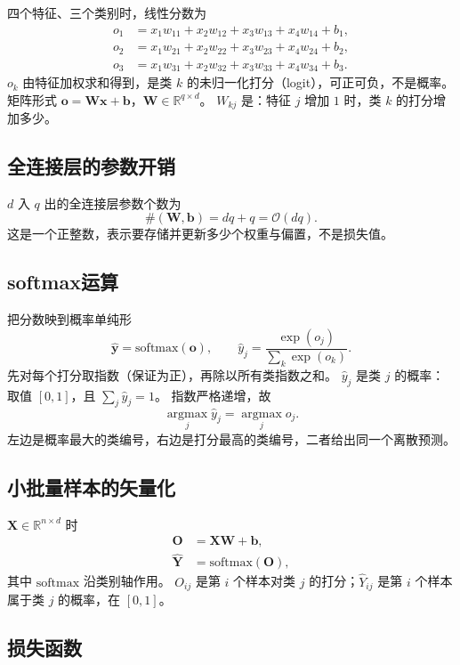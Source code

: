 四个特征、三个类别时，线性分数为
\begin{align*}
o_{1}&=x_{1}w_{11}+x_{2}w_{12}+x_{3}w_{13}+x_{4}w_{14}+b_{1},\\
o_{2}&=x_{1}w_{21}+x_{2}w_{22}+x_{3}w_{23}+x_{4}w_{24}+b_{2},\\
o_{3}&=x_{1}w_{31}+x_{2}w_{32}+x_{3}w_{33}+x_{4}w_{34}+b_{3}.
\end{align*}
$o_k$ 由特征加权求和得到，是类 $k$ 的未归一化打分（logit），可正可负，不是概率。
矩阵形式 $\bm{o}=\bm{W}\bm{x}+\bm{b}$，$\bm{W}\in\mathbb{R}^{q\times d}$。
$W_{kj}$ 是：特征 $j$ 增加 $1$ 时，类 $k$ 的打分增加多少。

\subsection{全连接层的参数开销}

$d$ 入 $q$ 出的全连接层参数个数为
\[
\#(\bm{W},\bm{b})=dq+q=\mathcal{O}(dq).
\]
这是一个正整数，表示要存储并更新多少个权重与偏置，不是损失值。

\subsection{softmax运算}

把分数映到概率单纯形
\[
\hat{\bm{y}}=\mathrm{softmax}(\bm{o}),
\qquad
\hat{y}_{j}=\frac{\exp(o_{j})}{\sum_{k}\exp(o_{k})}.
\]
先对每个打分取指数（保证为正），再除以所有类指数之和。
$\hat{y}_{j}$ 是类 $j$ 的概率：取值 $[0,1]$，且 $\sum_{j}\hat{y}_{j}=1$。
指数严格递增，故
\[
\operatorname*{argmax}_{j}\hat{y}_{j}=\operatorname*{argmax}_{j}o_{j}.
\]
左边是概率最大的类编号，右边是打分最高的类编号，二者给出同一个离散预测。

\subsection{小批量样本的矢量化}

$\bm{X}\in\mathbb{R}^{n\times d}$ 时
\begin{align*}
\bm{O}&=\bm{X}\bm{W}+\bm{b},\\
\hat{\bm{Y}}&=\mathrm{softmax}(\bm{O}),
\end{align*}
其中 $\mathrm{softmax}$ 沿类别轴作用。
$O_{ij}$ 是第 $i$ 个样本对类 $j$ 的打分；$\hat{Y}_{ij}$ 是第 $i$ 个样本属于类 $j$ 的概率，在 $[0,1]$。

\subsection{损失函数}

